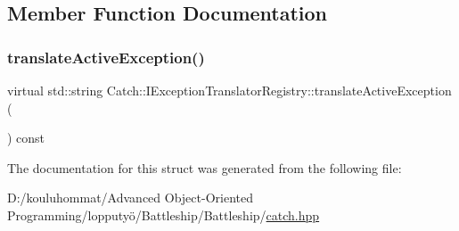 \subsection{Member Function Documentation}
\mbox{\label{struct_catch_1_1_i_exception_translator_registry_af76ae8c331a17f2a94c9720bc0d686bb}} 
\subsubsection{\texorpdfstring{translate\+Active\+Exception()}{translateActiveException()}}
{\footnotesize\ttfamily virtual std\+::string Catch\+::\+I\+Exception\+Translator\+Registry\+::translate\+Active\+Exception (\begin{DoxyParamCaption}{ }\end{DoxyParamCaption}) const\hspace{0.3cm}{\ttfamily [pure virtual]}}



The documentation for this struct was generated from the following file\+:\begin{DoxyCompactItemize}
\item 
D\+:/kouluhommat/\+Advanced Object-\/\+Oriented Programming/lopputyö/\+Battleship/\+Battleship/\mbox{\hyperlink{catch_8hpp}{catch.\+hpp}}\end{DoxyCompactItemize}
